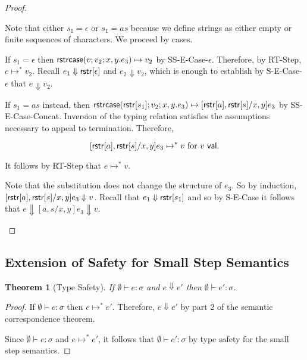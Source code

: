 \documentclass[11pt,leqno]{article}
\newtheorem{thm}{Theorem}
\theoremstyle{definition}
\newcommand{\sistr}[1]{{\sf rstr}[#1]}   \newcommand{\rstr}[1]{{\sf rstr}[#1]} %
\newcommand{\val}{{\sf val}}
\newcommand{\strin}[1]{\sistr{#1}}
\newcommand{\strcase}[3]{ {\sf rstrcase}(#1; #2; #3)}
\newcommand{\sreduces}{ \Downarrow }
\begin{document}
\begin{proof}
\begin{itemize}[label=$ $,itemsep=1ex]
Note that either $s_1 = \epsilon$ or $s_1 = as$ because we define strings as either empty or finite sequences of characters.
We proceed by cases.

If $s_1 = \epsilon$ then $\strcase{v}{v_2}{x,y.e_3} \mapsto v_2$ by SS-E-Case-$\epsilon$.
Therefore, by RT-Step, $e \mapsto^* v_2$.
Recall $e_1 \sreduces \strin{\epsilon}$ and $e_2 \sreduces v_2$, which is enough to establish by S-E-Case-$\epsilon$ that $e \sreduces v_2$.

If $s_1 = as$ instead, then $\strcase{\strin{s_1}}{v_2}{x,y.e_3} \mapsto [\strin{a},\strin{s} / x,y ] e_3$ by SS-E-Case-Concat.
Inversion of the typing relation satisfies the assumptions necessary to appeal to termination.
Therefore,

\[ [\strin{a},\strin{s} / x,y ] e_3 \mapsto^* v \text{ for } v \ \val. \]

It follows by RT-Step that $e \mapsto^* v$.

Note that the substitution does not change the structure of $e_3$.
So by induction, $[\strin{a},\strin{s} / x,y ] e_3 \sreduces v$.
Recall that $e_1 \sreduces \strin{s_1}$ and so by S-E-Case it follows that $e \sreduces [a,s / x,y] e_3 \sreduces v$.
\end{itemize}

\end{proof}


\subsection{Extension of Safety for Small Step Semantics}

\begin{thm}[Type Safety] \label{thm:typesafety}
  If $\emptyset \vdash e : \sigma$ 
  and $e \sreduces e'$ then $\emptyset \vdash e' : \sigma$.
\end{thm}
\begin{proof}
If $\emptyset \vdash e : \sigma$ then $e \mapsto^* e'$.
Therefore, $e \sreduces e'$ by part 2 of the semantic correspondence theorem.

Since $\emptyset \vdash e : \sigma$ and $e \mapsto^* e'$, it follows that $\emptyset \vdash e' : \sigma$ by type safety for the small step semantics.
\end{proof}
\end{document}
